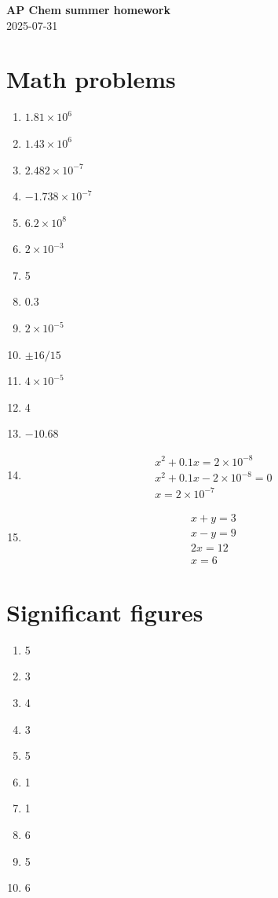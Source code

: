 \documentclass[a4paper, 12pt]{article}
\begin{document}
\begin{center}
\textbf{{\Large AP Chem summer homework}} \\
2025-07-31
\end{center}

\setcounter{section}{1}

\section{Math problems}

\begin{enumerate}[label=\alph*.]
    \item $1.81 \times 10^6$
    \item $1.43 \times 10^6$
    \item $2.482 \times 10^{-7}$
    \item $-1.738 \times 10^{-7}$
    \item $6.2 \times 10^{8}$
    \item $2 \times 10^{-3}$
    \item 5
    \item 0.3
    \item $2 \times 10^{-5}$
    \item $\pm 16/15$
    \item $4 \times 10^{-5}$
    \item 4
    \item $-10.68$
    \item
    \begin{gather*}
    x^2 + 0.1x = 2 \times 10^{-8} \\
    x^2 + 0.1x - 2 \times 10^{-8} = 0 \\
    x = \boxed{2 \times 10^{-7}}
    \end{gather*}
    \item 
    \begin{gather*}
    x + y = 3 \\
    x - y = 9 \\
    2x = 12 \\
    \boxed{x = 6}
    \end{gather*}
\end{enumerate}

\section{Significant figures}


\begin{enumerate}[label=\alph*.]
    \item 5
    \item 3
    \item 4
    \item 3
    \item 5
    \item 1
    \item 1
    \item 6
    \item 5
    \item 6
\end{enumerate}
\end{document}
